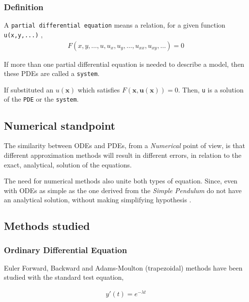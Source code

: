 \documentclass[12pt]{article}
\begin{document}
\subsubsection{Definition}
\label{sec:orgb7d42a6}
A \texttt{partial differential equation} means a relation, for a given function
\texttt{u(x,y,...)} \cite{john1978partial},
\begin{equation}
\label{eq:PDE}
\begin{aligned}
F(x,y,\ldots ,u,u_{x}, u_{y}, \ldots, u_{xx}, u_{xy}, \ldots{})=0
\end{aligned}
\end{equation}

If more than one partial differential equation is needed to describe a model,
then these PDEs are called a \texttt{system}.

If substituted an \(u(\mathbf{x})\) which satisfies
\(F(\mathbf{x},\mathbf{u(x)})=0\). Then, \texttt{u} is a solution of the \texttt{PDE} or the
\texttt{system}.

\subsection{Numerical standpoint}
\label{sec:org36ed4fa}
The similarity between ODEs and PDEs, from a \emph{Numerical} point of view, is
that different approximation methods will result in different errors,
in relation to the exact, analytical, solution of the equations.

The need for numerical methods also unite both types of
equation. Since, even with ODEs as simple as the one derived from the
\emph{Simple Pendulum} do not have an analytical solution, without making simplifying
hypothesis \cite{brauer1989qualitative}.

\subsection{Methods studied}
\label{sec:orgf7e6c65}

\subsubsection{Ordinary Differential Equation}
\label{sec:orgf30f7a4}
Euler Forward, Backward and Adams-Moulton (trapezoidal) methods have been
studied with the standard test equation,

\begin{equation}
\begin{aligned}
y'(t)=e^{- \lambda{}t}
\end{aligned}
\end{equation}
\end{document}
